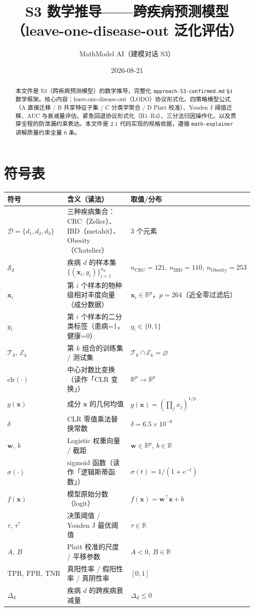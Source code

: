 \documentclass{internal-report}
\title{S3 数学推导——跨疾病预测模型（leave-one-disease-out 泛化评估）}
\author{MathModel AI（建模对话 S3）}
\date{2026-08-21}
\begin{document}
\maketitle

\begin{abstract}
本文件是 S3（跨疾病预测模型）的数学推导，完整化 \texttt{approach-S3-confirmed.md} §4 数学框架。核心内容：leave-one-disease-out（LODO）协议形式化、四策略模型公式（A 直接迁移 / B 共享特征子集 / C 分类学聚合 / D Platt 校准）、Youden J 阈值迁移、AUC 与衰减量评估、紧急回退协议形式化（R1--R4）、三分法归因操作化，以及贯穿全程的防泄漏约束表达。本文件是 2.1 代码实现的规格依据，遵循 \texttt{math-explainer} 讲解质量约束全量 6 条。
\end{abstract}

\section{符号表}

\begin{tabular}{lp{}p{}}
\toprule
符号 & 含义（读法） & 取值/分布 \\
\midrule
$\mathcal{D}=\{d_1,d_2,d_3\}$ & 三种疾病集合：CRC（Zeller）、IBD（metahit）、Obesity（Chatelier） & 3 个元素 \\
$\mathcal{S}_d$ & 疾病 $d$ 的样本集 $\{(\mathbf{x}_i,y_i)\}_{i=1}^{n_d}$ & $n_{\text{CRC}}=121,\ n_{\text{IBD}}=110,\ n_{\text{Obesity}}=253$ \\
$\mathbf{x}_i$ & 第 $i$ 个样本的物种级相对丰度向量（成分数据） & $\mathbf{x}_i\in\mathbb{R}^{p}$，$p=264$（近全零过滤后） \\
$y_i$ & 第 $i$ 个样本的二分类标签（患病=1，健康=0） & $y_i\in\{0,1\}$ \\
$\mathcal{T}_k,\ \mathcal{E}_k$ & 第 $k$ 组合的训练集 / 测试集 & $\mathcal{T}_k\cap\mathcal{E}_k=\varnothing$ \\
$\text{clr}(\cdot)$ & 中心对数比变换（读作「CLR 变换」） & $\mathbb{R}^{p}\to\mathbb{R}^{p}$ \\
$g(\mathbf{x})$ & 成分 $\mathbf{x}$ 的几何均值 & $g(\mathbf{x})=\left(\prod_j x_j\right)^{1/p}$ \\
$\delta$ & CLR 零值乘法替换常数 & $\delta=6.5\times10^{-6}$ \\
$\mathbf{w},\ b$ & Logistic 权重向量 / 截距 & $\mathbf{w}\in\mathbb{R}^{p},\ b\in\mathbb{R}$ \\
$\sigma(\cdot)$ & sigmoid 函数（读作「逻辑斯蒂函数」） & $\sigma(t)=1/(1+e^{-t})$ \\
$f(\mathbf{x})$ & 模型原始分数（logit） & $f(\mathbf{x})=\mathbf{w}^{\top}\mathbf{z}+b$ \\
$\tau,\ \tau^{*}$ & 决策阈值 / Youden J 最优阈值 & $\tau\in\mathbb{R}$ \\
$A,\ B$ & Platt 校准的尺度 / 平移参数 & $A<0,\ B\in\mathbb{R}$ \\
$\text{TPR},\ \text{FPR},\ \text{TNR}$ & 真阳性率 / 假阳性率 / 真阴性率 & $[0,1]$ \\
$\Delta_d$ & 疾病 $d$ 的跨疾病衰减量 & $\Delta_d\le 0$ \\
\bottomrule
\end{tabular}
\end{document}
